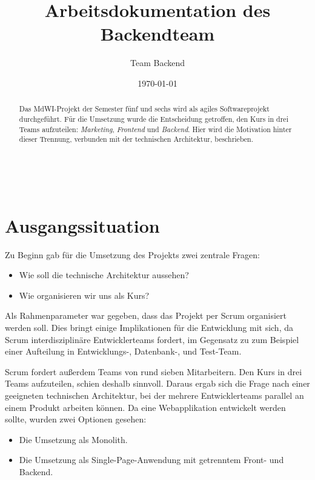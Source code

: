 \documentclass[a4paper, 11pt]{article}
\title{\textbf{Arbeitsdokumentation des Backendteam}}
\author{Team Backend}
\date{\today} %
\makeatletter
\renewcommand{\maketitle}{ %
\begin{flushright} %
{\LARGE\@title} %

\vspace{10pt} %

{\large\@author} %
\\\@date %

\vspace{20pt} %
\end{flushright}
}
\makeatother
\begin{document}
\renewcommand{\@listI}{\itemsep=0pt} %



\maketitle %

\begin{abstract}
    Das MdWI-Projekt der Semester fünf und sechs wird als agiles
    Softwareprojekt durchgeführt. Für die Umsetzung wurde die Entscheidung
    getroffen, den Kurs in drei Teams aufzuteilen: \emph{Marketing},
    \emph{Frontend} und \emph{Backend}. Hier wird die Motivation hinter dieser
    Trennung, verbunden mit der technischen Architektur, beschrieben.
\end{abstract}

\section{Ausgangssituation}

Zu Beginn gab für die Umsetzung des Projekts zwei zentrale Fragen:

\begin{itemize}
    \item Wie soll die technische Architektur aussehen?
    \item Wie organisieren wir uns als Kurs?
\end{itemize}

Als Rahmenparameter war gegeben, dass das Projekt per Scrum organisiert werden
soll. Dies bringt einige Implikationen für die Entwicklung mit sich, da Scrum
interdisziplinäre Entwicklerteams fordert, im Gegensatz zu zum Beispiel einer
Aufteilung in Entwicklungs-, Datenbank-, und Test-Team.

Scrum fordert außerdem Teams von rund sieben Mitarbeitern. Den Kurs in drei
Teams aufzuteilen, schien deshalb sinnvoll. Daraus ergab sich die Frage nach
einer geeigneten technischen Architektur, bei der mehrere Entwicklerteams
parallel an einem Produkt arbeiten können. Da eine Webapplikation entwickelt
werden sollte, wurden zwei Optionen gesehen:

\begin{itemize}
    \item Die Umsetzung als Monolith.
    \item Die Umsetzung als Single-Page-Anwendung mit getrenntem Front- und
        Backend. 
\end{itemize}
\end{document}
